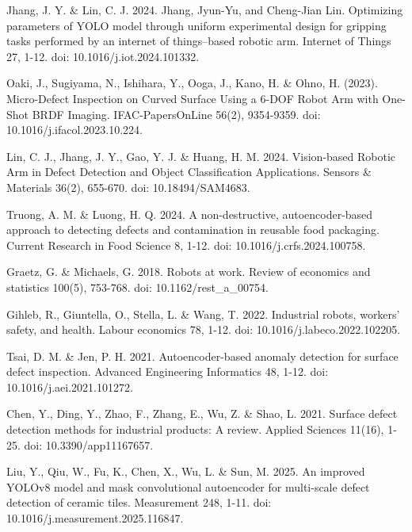 
\begin{thebibliography}{9}

  Jhang, J. Y. \& Lin, C. J. 2024. Jhang, Jyun-Yu, and Cheng-Jian
  Lin. Optimizing parameters of YOLO model through uniform
  experimental design for gripping tasks performed by an internet of
  things–based robotic arm. Internet of Things 27, 1-12. doi:
  10.1016/j.iot.2024.101332.

  Oaki, J., Sugiyama, N., Ishihara, Y., Ooga, J., Kano, H. \& Ohno,
  H. (2023). Micro-Defect Inspection on Curved Surface Using a 6-DOF
  Robot Arm with One-Shot BRDF Imaging. IFAC-PapersOnLine 56(2),
  9354-9359. doi: 10.1016/j.ifacol.2023.10.224.

  Lin, C. J., Jhang, J. Y., Gao, Y. J. \& Huang, H. M. 2024.
  Vision-based Robotic Arm in Defect Detection and Object
  Classification Applications. Sensors \& Materials 36(2), 655-670.
  doi: 10.18494/SAM4683.

  Truong, A. M. \& Luong, H. Q. 2024. A non-destructive,
  autoencoder-based approach to detecting defects and contamination
  in reusable food packaging. Current Research in Food Science 8, 1-12.
  doi: 10.1016/j.crfs.2024.100758.

  Graetz, G. \& Michaels, G. 2018. Robots at work. Review of
  economics and statistics 100(5), 753-768. doi: 10.1162/rest\_a\_00754.

  Gihleb, R., Giuntella, O., Stella, L. \& Wang, T. 2022.
  Industrial robots, workers’ safety, and health. Labour economics
  78, 1-12. doi: 10.1016/j.labeco.2022.102205.

  Tsai, D. M. \& Jen, P. H. 2021. Autoencoder-based anomaly detection
  for surface defect inspection. Advanced Engineering Informatics 48,
  1-12. doi: 10.1016/j.aei.2021.101272.

  Chen, Y., Ding, Y., Zhao, F., Zhang, E., Wu, Z. \& Shao, L. 2021.
  Surface defect detection methods for industrial products: A review.
  Applied Sciences 11(16), 1-25. doi: 10.3390/app11167657.

  Liu, Y., Qiu, W., Fu, K., Chen, X., Wu, L. \& Sun, M. 2025. An
  improved YOLOv8 model and mask convolutional autoencoder for
  multi-scale defect detection of ceramic tiles. Measurement 248,
  1-11. doi: 10.1016/j.measurement.2025.116847.


\end{thebibliography}
